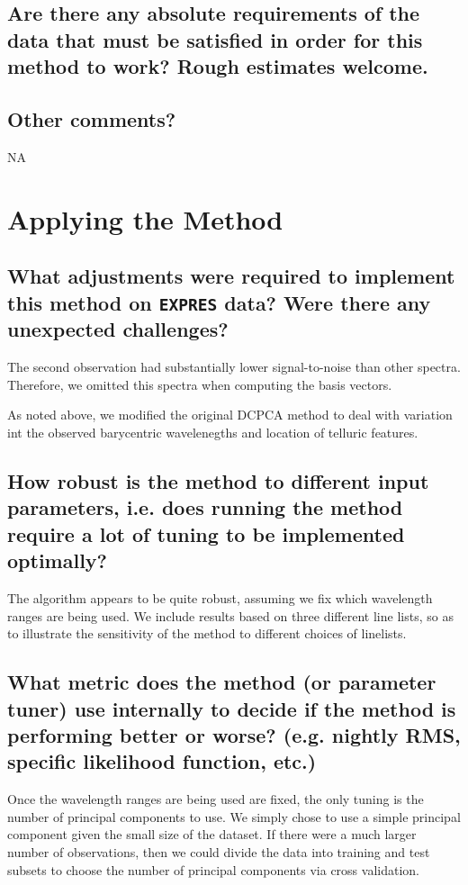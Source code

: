 \documentclass[12pt]{article}
\begin{document}
\subsection{Are there any absolute requirements of the data that must be satisfied in order for this method to work?  Rough estimates welcome.}


\subsection{Other comments?}

NA

\section{Applying the Method}
\subsection{What adjustments were required to implement this method on \texttt{EXPRES} data?  Were there any unexpected challenges?}

The second observation had substantially lower signal-to-noise than other spectra.
Therefore, we omitted this spectra when computing the basis vectors.

As noted above, we modified the original DCPCA method to deal with variation int the observed barycentric wavelenegths and location of telluric features.

\subsection{How robust is the method to different input parameters, i.e. does running the method require a lot of tuning to be implemented optimally?}

The algorithm appears to be quite robust, assuming we fix which wavelength ranges are being used.
We include results based on three different line lists, so as to illustrate the sensitivity of the method to different choices of linelists.

\subsection{What metric does the method (or parameter tuner) use internally to decide if the method is performing better or worse?  (e.g. nightly RMS, specific likelihood function, etc.)}

Once the  wavelength ranges are being used are fixed, the only tuning is the number of principal components to use.
We simply chose to use a simple principal component given the small size of the dataset.
If there were a much larger number of observations, then we could divide the data into training and test subsets to choose the number of principal components via cross validation.
\end{document}
